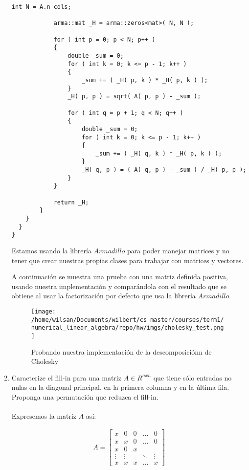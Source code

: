 \documentclass{article}
\begin{document}
\begin{enumerate}
\begin{lstlisting}[frame=single]
            int N = A.n_cols;

            arma::mat _H = arma::zeros<mat>( N, N );

            for ( int p = 0; p < N; p++ )
            {
                double _sum = 0;
                for ( int k = 0; k <= p - 1; k++ )
                {
                    _sum += ( _H( p, k ) * _H( p, k ) );
                }
                _H( p, p ) = sqrt( A( p, p ) - _sum );

                for ( int q = p + 1; q < N; q++ )
                {
                    double _sum = 0;
                    for ( int k = 0; k <= p - 1; k++ )
                    {
                        _sum += ( _H( q, k ) * _H( p, k ) );
                    }
                    _H( q, p ) = ( A( q, p ) - _sum ) / _H( p, p );
                }
            }

            return _H;
        }
    }
  }
}
\end{lstlisting}
Estamos usando la librer\'ia $Armadillo$ para poder manejar matrices y no tener que crear nuestras propias clases para trabajar con matrices y vectores.

A continuaci\'on se muestra una prueba con una matriz definida positiva, usando nuestra implementaci\'on y compar\'andola con el resultado que se obtiene al usar la factorizaci\'on por defecto que usa la librer\'ia $Armadillo$.

\begin{figure}[H]
	\centering
	\texttt{[image: /home/wilsan/Documents/wilbert/cs\_master/courses/term1/numerical\_linear\_algebra/repo/hw/imgs/cholesky\_test.png]}
	\caption{Probando nuestra implementaci\'on de la descomposici\'onn de Cholesky}
	\label{fig:img_pecc}
\end{figure}


\item Caracterize el fill-in para una matriz $A \in R^{nxn}$ que tiene s\'olo entradas no nulas en la diagonal principal, en la primera columna y en la \'ultima fila. Proponga una permutaci\'on que reduzca el fill-in.
\\
\\
Expresemos la matriz $A$ as\'i:

\begin{gather*}
A = 
	\begin{bmatrix}
		x & 0 & 0 & \hdots & 0 \\
		x & x & 0 & \hdots & 0 \\
		x & 0 & x \\
		\vdots & \vdots && \ddots & \vdots \\
		x & x & x & \hdots & x
	\end{bmatrix}
\end{gather*}


\end{enumerate}
\end{document}
